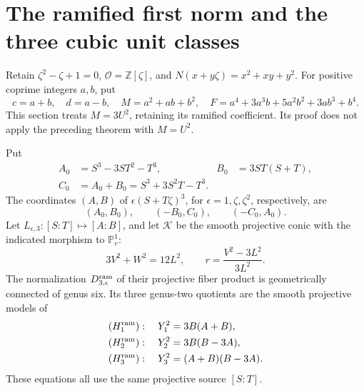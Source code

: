 \section{The ramified first norm and the three cubic unit classes}
\label{rsx-section}

Retain \(\zeta^2-\zeta+1=0\),
\(\mathcal O=\mathbb Z[\zeta]\), and
\(N(x+y\zeta)=x^2+xy+y^2\). For positive coprime integers
\(a,b\), put
\[
 c=a+b,\quad d=a-b,\quad M=a^2+ab+b^2,\quad
 F=a^4+3a^3b+5a^2b^2+3ab^3+b^4.
\]
This section treats \(M=3U^2\), retaining its ramified coefficient.
Its proof does not apply the preceding theorem with \(M=U^2\).

\begin{proposition}
\label{rsx-models}
Put
\begin{align}
 A_0&=S^3-3ST^2-T^3,& B_0&=3ST(S+T),\nonumber\\
 C_0&=A_0+B_0=S^3+3S^2T-T^3.
 \label{rsx-cubics}
\end{align}
The coordinates \((A,B)\) of
\(\epsilon(S+T\zeta)^3\), for
\(\epsilon=1,\zeta,\zeta^2\), respectively, are
\begin{equation}
 (A_0,B_0),\qquad(-B_0,C_0),\qquad(-C_0,A_0).
 \label{rsx-unit-coordinates}
\end{equation}
Let \(L_{\epsilon,3}:[S:T]\mapsto[A:B]\), and let
\(\mathcal K\) be the smooth projective conic with the indicated
morphism to \(\mathbb P^1_r\):
\begin{equation}
 3V^2+W^2=12L^2,\qquad
 r=\frac{V^2-3L^2}{3L^2}.
 \label{rsx-conic}
\end{equation}
The normalization \(D^{\rm ram}_{3,\epsilon}\) of their
projective fiber product is geometrically connected of genus six.
Its three genus-two quotients are the smooth projective models of
\begin{align}
 (H^{\rm ram}_1):\quad Y_1^2&=3B(A+B),\nonumber\\
 (H^{\rm ram}_2):\quad Y_2^2&=3B(B-3A),\nonumber\\
 (H^{\rm ram}_3):\quad Y_3^2&=(A+B)(B-3A).
 \label{rsx-quotients}
\end{align}
These equations all use the same projective source \([S:T]\).
\end{proposition}
